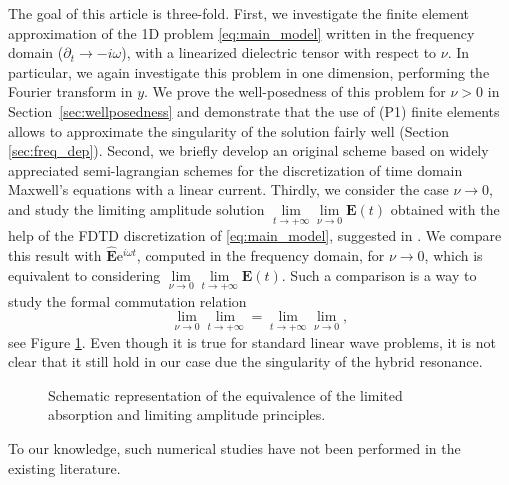 The goal of this article is three-fold. 
First, we investigate the finite element approximation of the 1D 
problem \eqref{eq:main_model} written in the frequency domain ($\partial_t\rightarrow -i\omega$), with a linearized dielectric tensor with respect to $\nu$.
In particular, we again investigate this problem in one dimension, performing the Fourier transform in $y$.
We prove the well-posedness of this problem for $\nu>0$ in Section~\ref{sec:wellposedness} and 
demonstrate that the use of  (P1) finite elements allows to approximate the singularity 
of the solution fairly well (Section \ref{sec:freq_dep}). 
Second, we briefly develop an original scheme based on widely appreciated semi-lagrangian schemes
for the discretization of time domain Maxwell's equations with a linear current.
Thirdly, we consider the case $\nu\rightarrow 0$, and study the limiting amplitude solution 
$\lim\limits_{t\rightarrow +\infty}\lim\limits_{\nu\rightarrow 0}\mathbf{E}(t)$ obtained with the help of 
the FDTD discretization of \eqref{eq:main_model}, suggested in \cite{stable_yee_plasma_current}. 
We compare this result with 
$\hat{\mathbf{E}}\mathrm{e}^{i\omega t}$, computed in the frequency domain, for $\nu\rightarrow 0$, which is equivalent to considering
$\lim\limits_{\nu\rightarrow 0}\lim\limits_{t\rightarrow+\infty}\mathbf{E}(t)$.
Such a comparison is a way to study the formal commutation relation
$$
\lim\limits_{\nu\rightarrow 0}\lim\limits_{t\rightarrow+\infty}= \lim\limits_{t\rightarrow+\infty}\lim\limits_{\nu\rightarrow 0},
$$
see Figure \ref{fig:limits}. 
Even though it is true for standard linear wave problems, it is not clear that it still hold in our case due the singularity
of the hybrid resonance.
\begin{figure}
 \caption{Schematic representation of the equivalence of the limited absorption and limiting amplitude principles.}
\label{fig:limits}
\end{figure}

To our knowledge, such numerical studies have not been performed in the existing literature. 
